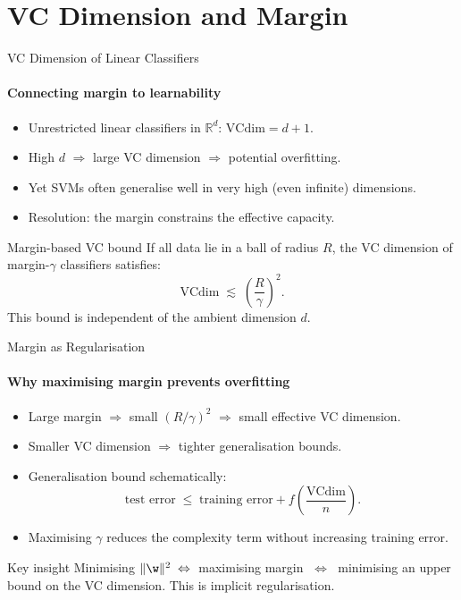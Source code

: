 \section{VC Dimension and Margin}

\begin{frame}{VC Dimension of Linear Classifiers}
  \framesubtitle{Connecting margin to learnability}
  \begin{itemize}
    \item Unrestricted linear classifiers in $\mathbb{R}^d$: $\mathrm{VCdim} = d+1$.
    \item High $d$ $\Rightarrow$ large VC dimension $\Rightarrow$ potential overfitting.
    \item Yet SVMs often generalise well in very high (even infinite) dimensions.
    \item \alert{Resolution}: the margin constrains the effective capacity.
  \end{itemize}
  \vspace{0.5em}
  \begin{block}{Margin-based VC bound}
    If all data lie in a ball of radius $R$, the VC dimension of margin-$\gamma$ classifiers satisfies:
    \[
      \mathrm{VCdim} \;\lesssim\; \left(\frac{R}{\gamma}\right)^2.
    \]
    This bound is \alert{independent of the ambient dimension $d$}.
  \end{block}
\end{frame}

\begin{frame}{Margin as Regularisation}
  \framesubtitle{Why maximising margin prevents overfitting}
  \begin{itemize}
    \item Large margin $\Rightarrow$ small $(R/\gamma)^2$ $\Rightarrow$ small effective VC dimension.
    \item Smaller VC dimension $\Rightarrow$ tighter generalisation bounds.
    \item Generalisation bound schematically:
          \[
            \text{test error} \;\le\; \text{training error} + f\!\left(\frac{\mathrm{VCdim}}{n}\right).
          \]
    \item \alert{Maximising $\gamma$} reduces the complexity term without increasing training error.
  \end{itemize}
  \begin{block}{Key insight}
    Minimising $\|\w\|^2 \;\Leftrightarrow\; $ maximising margin $\;\Leftrightarrow\;$
    minimising an upper bound on the VC dimension.
    This is implicit regularisation.
  \end{block}
\end{frame}


